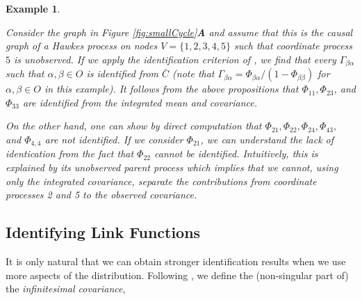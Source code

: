\documentclass[accepted]{uai2021} %
\newtheorem{exmp}[thm]{Example}
\begin{document}
\begin{exmp}
\begin{figure*}
\begin{subfigure}{0.3\linewidth}
\begin{tikzpicture}[scale=0.7]
					\end{tikzpicture}
				\end{subfigure}
				\caption{\label{fig:smallCycle} \textbf{A}: Directed graph such 
					that 
					each node represents a coordinate process and an edge 
					$\alpha 
					\rightarrow \beta$ implies that $\Phi_{\beta\alpha}\neq 0$. 
					\textbf{B}: Latent projection of the graph \textbf{A} on 
					nodes $O = 
					\{1,2,3,4\}$. \textbf{C}: Graphs \textbf{B} and \textbf{C} 
					are 
					Markov 
					equivalent (entail the same $\mu$-separations), yet are 
					distinguishable using an equality constraint on the 
					observable 
					matrix $\bar{C} = C_{OO}$. Loops 
					(self-edges) are omitted from 
					graphs \textbf{A}, \textbf{B}, and \textbf{C}.}
			\end{figure*}
			
	Consider the graph in Figure \ref{fig:smallCycle}\textbf{A} and assume that 
	this is the causal graph of a Hawkes process on nodes $V = \{1,2,3,4,5\}$ 
	such that coordinate process $5$ is unobserved. If we apply the 
	identification criterion of \cite{weihs2018}, we find that every 
	$\Gamma_{\beta\alpha}$ 
	such that 
	$\alpha,\beta\in O$ is identified from $\bar{C}$ (note that 
	$\Gamma_{\beta\alpha}={\Phi}_{\beta\alpha}/(1-{\Phi}_{\beta\beta})$ 
	for $\alpha,\beta\in O$ in this example). It 
	follows 
	from the 
	above propositions that $\Phi_{11}, \Phi_{23}$, and $\Phi_{33}$ are 
	identified from 
	the integrated mean and covariance.
	
	On the other hand, one can show by direct computation that $\Phi_{21}, 
	\Phi_{22}, 
	\Phi_{24}, 
	\Phi_{43},$ and $\Phi_{4,4}$ are not identified. If we consider 
	$\Phi_{21}$, we can 
	understand the lack of identication from the fact that $\Phi_{22}$ 
	cannot 
	be identified. 
	Intuitively, this is explained by its unobserved parent process which 
	implies that we 
	cannot, using only the integrated covariance, separate the contributions 
	from coordinate processes 2 and 5 to the observed covariance. 
\end{exmp}



\subsection{Identifying Link Functions}
\label{ssec:idCauFunc}

It is only natural that we can obtain stronger identification results when we 
use more aspects of the distribution. Following 
\cite{bacry2016}, we define the (non-singular part of) the \emph{infinitesimal 
covariance},
\end{document}
